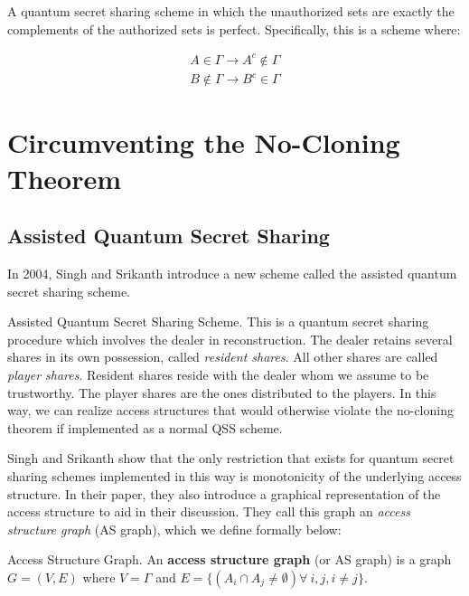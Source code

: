 \begin{theorem}
    A quantum secret sharing scheme in which the unauthorized sets are exactly the complements of the authorized sets is perfect. Specifically, this is a scheme where:
    
    \begin{align}
        A \in \Gamma \to A^c \notin \Gamma \\ 
        B \notin \Gamma \to B^c \in \Gamma
    \end{align}
\end{theorem}


\section{Circumventing the No-Cloning Theorem}

\subsection{Assisted Quantum Secret Sharing}
\label{ssec:aqss}

In 2004, Singh and Srikanth introduce a new scheme called the assisted quantum secret sharing scheme. 

\begin{definition}{Assisted Quantum Secret Sharing Scheme.}
    \label{defn:aqss}
    This is a quantum secret sharing procedure which involves the dealer in reconstruction. The dealer retains several shares in its own possession, called \textit{resident shares}. All other shares are called \textit{player shares}. Resident shares reside with the dealer whom we assume to be trustworthy. The player shares are the ones distributed to the players. In this way, we can realize access structures that would otherwise violate the no-cloning theorem if implemented as a normal QSS scheme. 
\end{definition}

Singh and Srikanth show that the only restriction that exists for quantum secret sharing schemes implemented in this way is monotonicity of the underlying access structure. In their paper, they also introduce a graphical representation of the access structure to aid in their discussion. They call this graph an \textit{access structure graph} (AS graph), which we define formally below:

\begin{definition}{Access Structure Graph.}
    \label{defn:access-structure-graph}
    An \textbf{access structure graph} (or AS graph) is a graph $G = (V,E)$ where $V = \Gamma$ and $E = \{(A_i \cap A_j \neq \emptyset) \forall\:i,j,i\neq j\}$.
\end{definition}

